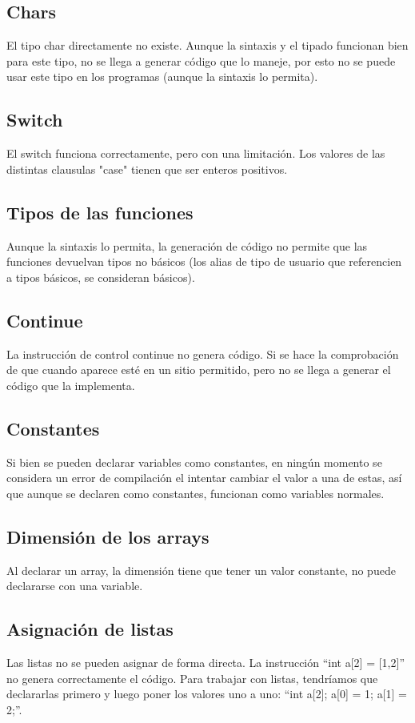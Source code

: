 \documentclass{article}
\begin{document}
\subsection{Chars}
El tipo char directamente no existe. Aunque la sintaxis y el tipado funcionan bien para este tipo, no se llega a generar código que lo maneje, por esto no se puede usar este tipo en los programas (aunque la sintaxis lo permita).

\subsection{Switch}
El switch funciona correctamente, pero con una limitación. Los valores de las distintas clausulas "case" tienen que ser enteros positivos.

\subsection{Tipos de las funciones}
Aunque la sintaxis lo permita, la generación de código no permite que las funciones devuelvan tipos no básicos (los alias de tipo de usuario que referencien a tipos básicos, se consideran básicos).

\subsection{Continue}
La instrucción de control continue no genera código. Si se hace la comprobación de que cuando aparece esté en un sitio permitido, pero no se llega a generar el código que la implementa.

\subsection{Constantes}
Si bien se pueden declarar variables como constantes, en ningún momento se considera un error de compilación el intentar cambiar el valor a una de estas, así que aunque se declaren como constantes, funcionan como variables normales.

\subsection{Dimensión de los arrays}
Al declarar un array, la dimensión tiene que tener un valor constante, no puede declararse con una variable.

\subsection{Asignación de listas}
Las listas no se pueden asignar de forma directa. La instrucción ``int a[2] = [1,2]'' no genera correctamente el código. Para trabajar con listas, tendríamos que declararlas primero y luego poner los valores uno a uno: ``int a[2]; a[0] = 1; a[1] = 2;''.
\end{document}
